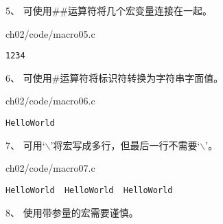 \begin{frame}[fragile]\ft{\secname}
5、 可使用{\tf \#\#}运算符将几个宏变量连接在一起。
\end{frame}

\begin{frame}[fragile]\ft{\secname}
{ch02/code/macro05.c}
\pause
\begin{lstlisting}[backgroundcolor=\color{red!10}]
1234
\end{lstlisting}
\end{frame}

\begin{frame}[fragile]\ft{\secname}
6、 可使用{\tf \#}运算符将标识符转换为字符串字面值。
\end{frame}

\begin{frame}[fragile]\ft{\secname}
{ch02/code/macro06.c}
\pause 
\begin{lstlisting}[backgroundcolor=\color{red!10}]
HelloWorld
\end{lstlisting}
\end{frame}

\begin{frame}[fragile]\ft{\secname}
7、 可用‘{$\backslash$}’将宏写成多行，但最后一行不需要‘{$\backslash$}’。
\end{frame}

\begin{frame}[fragile]\ft{\secname}

{ch02/code/macro07.c}
\end{frame}

\begin{frame}[fragile]\ft{\secname}
\begin{lstlisting}[backgroundcolor=\color{red!10}]
HelloWorld  HelloWorld  HelloWorld
\end{lstlisting}
\end{frame}

\begin{frame}[fragile]\ft{\secname}
8、 使用带参量的宏需要谨慎。
\end{frame}

